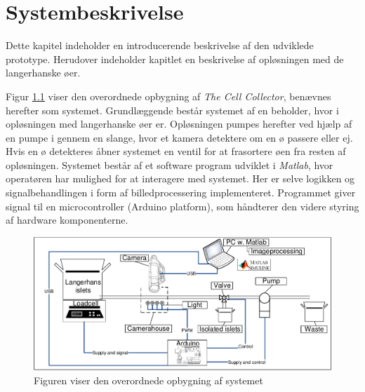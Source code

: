 \chapter{Systembeskrivelse}
Dette kapitel indeholder en introducerende beskrivelse af den udviklede prototype. Herudover indeholder kapitlet en beskrivelse af opløsningen med de langerhanske øer.

Figur \ref{fig:system} viser den overordnede opbygning af \textit{The Cell Collector}, benævnes herefter som systemet. Grundlæggende består systemet af en beholder, hvor i opløsningen med langerhanske øer er. Opløsningen pumpes herefter ved hjælp af en pumpe i gennem en slange, hvor et kamera detektere om en ø passere eller ej. Hvis en ø detekteres åbner systemet en ventil for at frasortere øen fra resten af opløsningen. Systemet består af et software program udviklet i \textit{Matlab}, hvor operatøren har mulighed for at interagere med systemet. Her er selve logikken og signalbehandlingen i form af billedprocessering implementeret. Programmet giver signal til en microcontroller (Arduino platform), som håndterer den videre styring af hardware komponenterne.

\begin{figure}[H]
	\centering
	\includegraphics[width=1\textwidth]{billeder/DMTS.pdf}
	\caption{Figuren viser den overordnede opbygning af systemet}
	\label{fig:system}
\end{figure}
%
%


